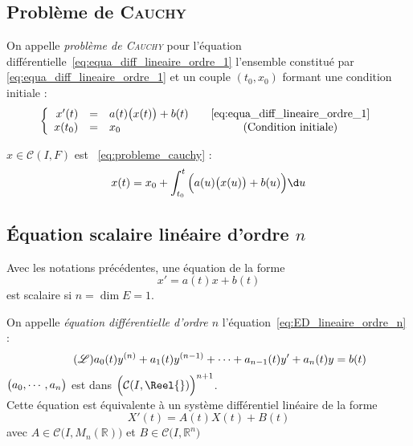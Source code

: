 \documentclass[11pt,a4paper,fleqn,pdftex]{report}
\begin{document}
\subsection{Problème de \textsc{Cauchy}} %
\label{sub:probleme_de_cauchy}
\begin{dfn}
     On appelle \emph{problème de \textsc{Cauchy}} pour l'équation différentielle~\eqref{eq:equa_diff_lineaire_ordre_1} l'ensemble constitué par \eqref{eq:equa_diff_lineaire_ordre_1} et un couple $(t_0,x_0)$ formant une condition initiale :
     \begin{equation}\label{eq:probleme_cauchy}
     \left\lbrace
     \begin{array}{rcl@{\qquad}c}
          x'(t) &=& a(t)\big( x(t)\big) +b(t)  &\eqref{eq:equa_diff_lineaire_ordre_1}\\
          x(t_0) &=& x_0                       &\text{(Condition initiale)}
     \end{array}
     \right.
     \end{equation}
\end{dfn}
\begin{theorem}
     $x\in \mathcal{C}(I,F)$ est ~\eqref{eq:probleme_cauchy} \ssi{} :
     \begin{equation}
     x(t) = x_0 + \int_{t_0}^t \Big( a(u)\big(x(u)\big) + b(u)\Big) \d u
     \end{equation}
\end{theorem}
\subsection{Équation scalaire linéaire d'ordre $n$} %
\label{sub:equation_scalaire_lineaire_d_ordre_n}
\begin{dfn}
     Avec les notations précédentes, une équation de la forme
     \begin{equation}
     x' = a(t)x + b(t)
     \end{equation}
     est scalaire si $n=\dim E = 1$.
\end{dfn}
\begin{dfn}
On appelle \emph{équation différentielle d'ordre $n$} l'équation~\eqref{eq:ED_lineaire_ordre_n} :
\begin{equation}\tag{\ensuremath{\mathscr{L}}}\label{eq:ED_lineaire_ordre_n}
a_0(t)y^{(n)}+a_1(t) y^{(n-1)}+\cdots + a_{n-1}(t) y' + a_n(t) y = b(t)
\end{equation}
$\left( \vphantom{3^3} a_0,\cdots ,a_n \right)$ est dans $\Big( \mathcal{C}(I,\Reel{})\Big)^{n+1} $. \\
Cette équation est équivalente à un système différentiel linéaire de la forme 
    $$ X'(t) = A(t)X(t) + B(t) $$ 
avec $A\in \mathcal{C}\Big( I,M_n (\mathbb{R})\Big) $ et $B \in \mathcal{C}\big( I,\mathbb{R}^n\big) $
\end{dfn}
\end{document}

